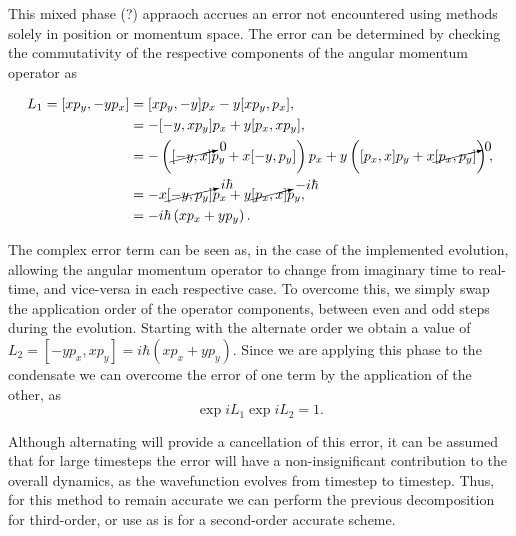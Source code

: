  This mixed phase (?) appraoch accrues an error not encountered using methods solely in position or momentum space. The error can be determined by checking the commutativity of the respective components of the angular momentum operator as

 \begin{subequations}
 \begin{align}
 	L_1 = [x p_y,-y p_x] &= [x p_y,-y] p_x  -  y[x p_y,p_x], \\
 				   &= -[-y,x p_y] p_x + y [p_x, x p_y], \\
 				   &= -\left( {\cancelto{0}{[-y,x]}} p_y + x [-y,p_y] \right) p_x + y \left( [p_x,x] p_y + x {\cancelto{0}{[p_x,p_y]}} \right), \\
 				   &= -x {\cancelto{i\hbar}{[-y, p_y]}} p_x + y {\cancelto{-i\hbar}{[p_x,x]}} p_y, \\
 				   &= -i\hbar \left(x p_x + y p_y \right).
 \end{align}
\end{subequations}

 The complex error term can be seen as, in the case of the implemented evolution, allowing the angular momentum operator to change from imaginary time to real-time, and vice-versa in each respective case. To overcome this, we simply swap the application order of the operator components, between even and odd steps during the evolution. Starting with the alternate order we obtain a value of $L_2 = [-y p_x, x p_y] = i\hbar \left(x p_x + y p_y \right)$. Since we are applying this phase to the condensate we can overcome the error of one term by the application of the other, as
 \begin{equation}
 \exp{i L_1}\exp{i L_2} = 1.
 \end{equation}

 Although alternating will provide a cancellation of this error, it can be assumed that for large timesteps the error will have a non-insignificant contribution to the overall dynamics, as the wavefunction evolves from timestep to timestep. Thus, for this method to remain accurate we can perform the previous decomposition for third-order, or use as is for a second-order accurate scheme.

